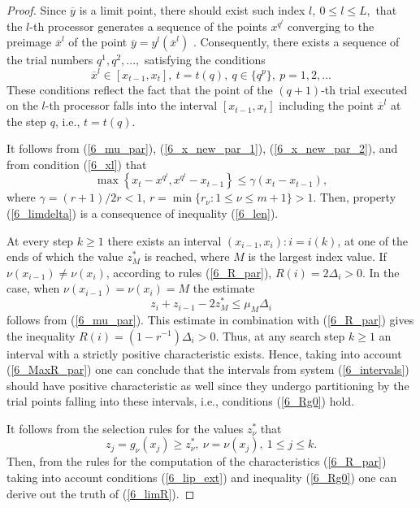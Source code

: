 \begin{proof}
Since $\overline{y}$ is a limit point, there should exist such index $l,\ 0\leq l \leq L,$ that the $l$-th processor generates a sequence of the points $x^{q^l}$  converging to the preimage $\overline{x}^l$ of the point $\overline{y} = y^l(\overline{x}^l)$ . Consequently, there exists a sequence of the trial numbers $q^1,q^2,...,$ satisfying the conditions 
	\begin{equation}\label{6_xl}
	\overline{x}^l \in \left[x_{t-1},x_t\right],\ t=t(q),\ q\in \{ q^p \},\ p=1,2, ...
	\end{equation}
These conditions reflect the fact that the point of the $(q+1)$-th trial executed on the $l$-th processor falls into the interval $[x_{t-1},x_t]$ including the point $\overline{x}^l$ at the step $q$, i.e., $t=t(q)$.

It follows from (\ref{6_mu_par}), (\ref{6_x_new_par_1}), (\ref{6_x_new_par_2}),  and from condition (\ref{6_xl}) that
	\begin{equation}\label{6_len}
	\max\left\{x_t-x^{q^l},x^{q^l}-x_{t-1}\right\}\leq \gamma (x_t-x_{t-1}),
	\end{equation}
where $\gamma = (r+1)/2r < 1$, $r = \min \{ r_\nu : 1\leq\nu\leq m+1 \} >1$. Then, property (\ref{6_limdelta}) is a consequence of inequality (\ref{6_len}).

At every step $k \geq 1$ there exists an interval $(x_{i-1},x_i): i=i(k)$, at one of the ends of which  the value $z_M^\ast$ is reached, where $M$ is the largest index value. If $\nu (x_{i-1}) \neq \nu(x_i)$, according to rules (\ref{6_R_par}), $R(i)=2\Delta_i > 0$. In the case, when $\nu(x_{i-1})=\nu(x_i)=M$ the estimate 
\[
z_i+z_{i-1}-2z_M^\ast \leq \mu_M\Delta_i
\]
follows from (\ref{6_mu_par}). This estimate in combination with (\ref{6_R_par}) gives the inequality $R(i)=(1-r^{-1})\Delta_i>0$. Thus, at any search step $k\geq 1$ an interval with a strictly positive characteristic exists. Hence, taking into account (\ref{6_MaxR_par}) one can conclude that the intervals from system (\ref{6_intervals}) should have positive characteristic as well since they undergo partitioning by the trial points falling into these intervals, i.e., conditions (\ref{6_Rg0}) hold.

It follows from the selection rules for the values $z_\nu^\ast$ that
\[
z_j = g_\nu(x_j)\geq z_\nu^\ast,\ \nu=\nu(x_j),\ 1\leq j\leq k.
\]
Then, from the rules for the computation of the characteristics (\ref{6_R_par}) taking into account conditions (\ref{6_lip_ext}) and inequality (\ref{6_Rg0}) one can derive out the truth of (\ref{6_limR}).
\end{proof}

